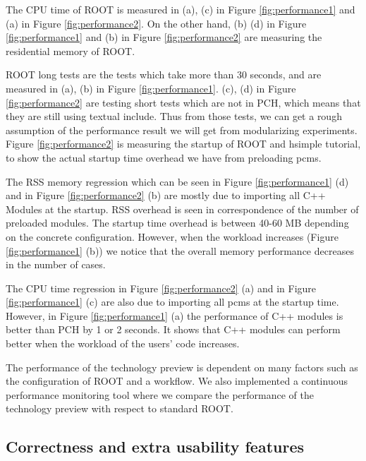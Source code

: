 \documentclass{webofc}
\begin{document}
The CPU time of ROOT is measured in (a), (c) in Figure \ref{fig:performance1} and (a) in Figure \ref{fig:performance2}. On the other hand, (b) (d) in Figure \ref{fig:performance1} and (b) in Figure \ref{fig:performance2} are measuring the residential memory of ROOT.

ROOT long tests are the tests which take more than 30 seconds, and are measured in (a), (b) in Figure \ref{fig:performance1}. (c), (d) in Figure \ref{fig:performance2} are testing short tests which are not in PCH, which means that they are still using textual include. Thus from those tests, we can get a rough assumption of the performance result we will get from modularizing experiments. Figure \ref{fig:performance2} is measuring the startup of ROOT and hsimple tutorial, to show the actual startup time overhead we have from preloading pcms.

The RSS memory regression which can be seen in Figure \ref{fig:performance1} (d) and in Figure \ref{fig:performance2} (b) are mostly due to importing all C++ Modules at the startup. RSS overhead is seen in correspondence of the number of preloaded modules. The startup time overhead is between 40-60 MB depending on the concrete configuration. However, when the workload increases (Figure \ref{fig:performance1} (b)) we notice that the overall memory performance decreases in the number of cases.

The CPU time regression in Figure \ref{fig:performance2} (a) and in Figure \ref{fig:performance1} (c) are also due to importing all pcms at the startup time. However, in Figure \ref{fig:performance1} (a) the performance of C++ modules is better than PCH by 1 or 2 seconds. It shows that C++ modules can perform better when the workload of the users' code increases.

The performance of the technology preview is dependent on many factors such as the configuration of ROOT and a workflow. We also implemented a continuous performance monitoring tool \cite{rootbench} where we compare the performance of the technology preview with respect to standard ROOT.

\subsection{Correctness and extra usability features}
\label{correctness}
\end{document}
